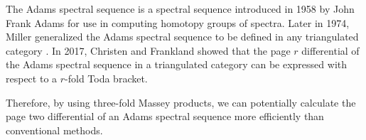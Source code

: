 The Adams spectral sequence is a spectral sequence introduced in 1958 by John Frank Adams for use in computing homotopy groups of spectra. Later in 1974, Miller generalized the Adams spectral sequence to be defined in any triangulated category \cite[Chapter I]{Miller_1975}. In 2017, Christen and Frankland \cite[Section 4, Section 6]{Christensen-Frankland_2017} showed that the page \( r \) differential of the Adams spectral sequence in a triangulated category can be expressed with respect to a \( r \)-fold Toda bracket.

Therefore, by using three-fold Massey products, we can potentially calculate the page two differential of an Adams spectral sequence more efficiently than conventional methods.